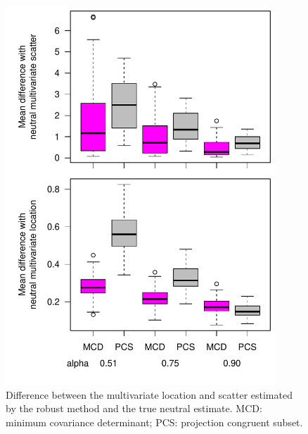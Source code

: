 \documentclass[12pt, oneside]{amsart}
\begin{document}
\begin{figure}[h]
\begin{center}
\includegraphics[width=4in]{../figures_man2/S2-LandsharcComparetoNeutlocationscatterPCSvsMCD.pdf}
\end{center}
\caption[]{Difference between the multivariate location and scatter estimated by the robust method and the true neutral estimate. MCD: minimum covariance determinant; PCS: projection congruent subset.
} 
 \label{fig:???}
\end{figure}
\end{document}
